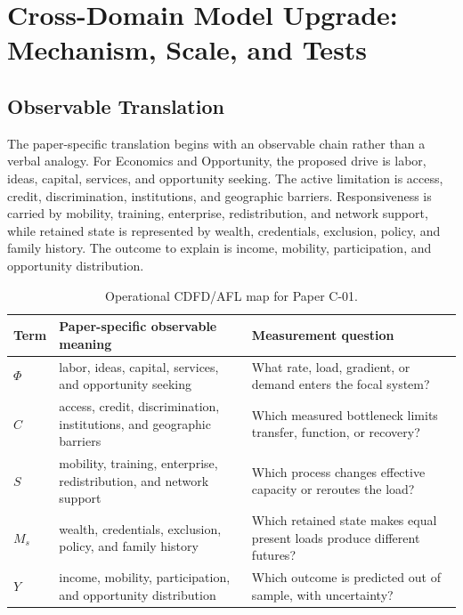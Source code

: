 \documentclass[11pt,a4paper]{article}
\begin{document}
\section{Cross-Domain Model Upgrade: Mechanism, Scale, and Tests}

\subsection{Observable Translation}

The paper-specific translation begins with an observable chain rather than a
verbal analogy. For Economics and Opportunity, the proposed drive is labor, ideas, capital, services, and opportunity seeking.
The active limitation is access, credit, discrimination, institutions, and geographic barriers. Responsiveness is carried by
mobility, training, enterprise, redistribution, and network support, while retained state is represented by
wealth, credentials, exclusion, policy, and family history. The outcome to explain is income, mobility, participation, and opportunity distribution.

\begin{table}[htbp]
\centering
\small
\caption{Operational CDFD/AFL map for Paper C-01.}
\begin{tabularx}{\textwidth}{|l|X|X|}
\hline
\textbf{Term} & \textbf{Paper-specific observable meaning} & \textbf{Measurement question} \\
\hline
$\Phi$ & labor, ideas, capital, services, and opportunity seeking & What rate, load, gradient, or demand enters the focal system? \\
\hline
$C$ & access, credit, discrimination, institutions, and geographic barriers & Which measured bottleneck limits transfer, function, or recovery? \\
\hline
$S$ & mobility, training, enterprise, redistribution, and network support & Which process changes effective capacity or reroutes the load? \\
\hline
$M_s$ & wealth, credentials, exclusion, policy, and family history & Which retained state makes equal present loads produce different futures? \\
\hline
$Y$ & income, mobility, participation, and opportunity distribution & Which outcome is predicted out of sample, with uncertainty? \\
\hline
\end{tabularx}
\end{table}
\end{document}

